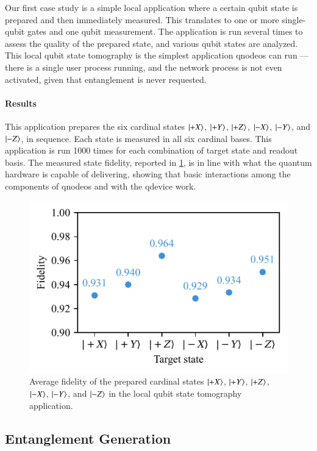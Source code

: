 Our first case study is a simple local application where a certain qubit state is prepared and then
immediately measured. This translates to one or more single-qubit gates and one qubit measurement.
The application is run several times to assess the quality of the prepared state, and various qubit
states are analyzed. This local qubit state tomography is the simplest application
\acrshort{qnodeos} can run --- there is a single user process running, and the network process is
not even activated, given that entanglement is never requested.

\paragraph{Results}

This application prepares the six cardinal states $\ket{+X}$, $\ket{+Y}$, $\ket{+Z}$, $\ket{-X}$,
$\ket{-Y}$, and $\ket{-Z}$, in sequence. Each state is measured in all six cardinal bases. This
application is run \num{1000} times for each combination of target state and readout basis. The
measured state fidelity, reported in \cref{fig:local-tomo}, is in line with what the quantum
hardware is capable of delivering, showing that basic interactions among the components of
\acrshort{qnodeos} and with the \acrshort{qdevice} work.

\begin{figure}[t]
    \centering
    \includegraphics[width=0.6\linewidth]{figures/local-tomography.pdf}
    \caption{
        Average fidelity of the prepared cardinal states $\ket{+X}$, $\ket{+Y}$, $\ket{+Z}$,
        $\ket{-X}$, $\ket{-Y}$, and $\ket{-Z}$ in the local qubit state tomography application.
    }
    \label{fig:local-tomo}
\end{figure}

\subsection{Entanglement Generation}

